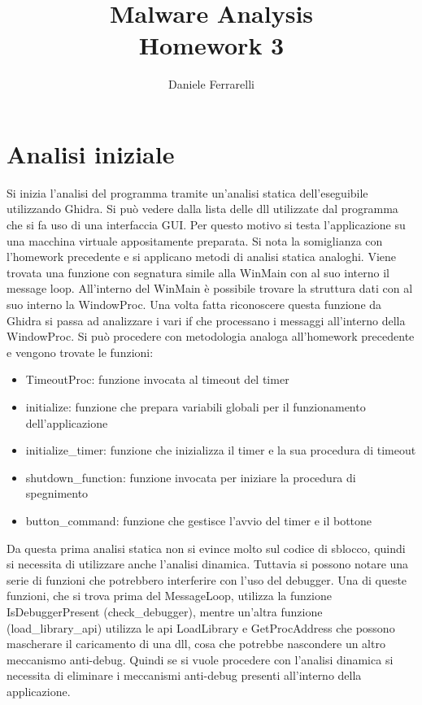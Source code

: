 \documentclass[a4paper,12pt]{article}
\title{Malware Analysis \\ \large Homework 3}
\author{Daniele Ferrarelli}
\date{}
\begin{document}
\maketitle

\section{Analisi iniziale}
Si inizia l'analisi del programma tramite un'analisi statica dell'eseguibile utilizzando Ghidra. Si può vedere dalla lista delle dll utilizzate dal programma che si fa uso di una interfaccia GUI. Per questo motivo si testa l'applicazione su una macchina virtuale appositamente preparata. Si nota la somiglianza con l'homework precedente e si applicano metodi di analisi statica analoghi. Viene trovata una funzione con segnatura simile alla WinMain con al suo interno il message loop. All'interno del WinMain è possibile trovare la struttura dati con al suo interno la WindowProc. Una volta fatta riconoscere questa funzione da Ghidra si passa ad analizzare i vari if che processano i messaggi all'interno della WindowProc. Si può procedere con metodologia analoga all'homework precedente e vengono trovate le funzioni:
\begin{itemize}
\item TimeoutProc: funzione invocata al timeout del timer
\item initialize: funzione che prepara variabili globali per il funzionamento dell'applicazione
\item initialize\_timer: funzione che inizializza il timer e la sua procedura di timeout
\item shutdown\_function: funzione invocata per iniziare la procedura di spegnimento
\item button\_command: funzione che gestisce l'avvio del timer e il bottone
\end{itemize}
Da questa prima analisi statica non si evince molto sul codice di sblocco, quindi si necessita di utilizzare anche l'analisi dinamica. Tuttavia si possono notare una serie di funzioni che potrebbero interferire con l'uso del debugger. Una di queste funzioni, che si trova prima del MessageLoop, utilizza la funzione IsDebuggerPresent (check\_debugger), mentre un'altra funzione (load\_library\_api) utilizza le api LoadLibrary e GetProcAddress che possono mascherare il caricamento di una dll, cosa che potrebbe nascondere un altro meccanismo anti-debug. Quindi se si vuole procedere con l'analisi dinamica si necessita di eliminare i meccanismi anti-debug presenti all'interno della applicazione. 
\end{document}
